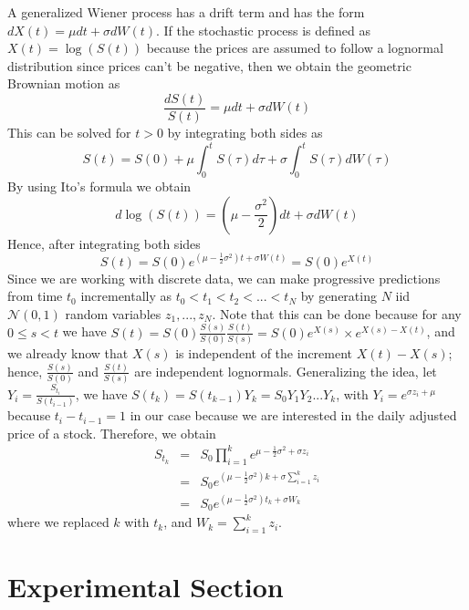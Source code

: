 \documentclass[12pt, A4]{article}
\begin{document}
A generalized Wiener process has a drift term and has the form $dX(t) = \mu dt + \sigma dW(t)$.
If the stochastic process is defined as $X(t)= \log(S(t))$ because the prices are assumed to follow a lognormal distribution since prices can't be negative, then we obtain the geometric Brownian motion as
\begin{equation}
	\frac{dS(t)}{S(t)} = \mu dt + \sigma dW(t) \label{GBM_diff}
\end{equation}
This can be solved for $t>0$ by integrating both sides as
\begin{equation}
	S(t) = S(0) + \mu \int_{0}^{t}S(\tau) d\tau + \sigma \int_{0}^{t} S(\tau)dW(\tau) \label{integrate_SDE}
\end{equation}
By using Ito's formula we obtain
\begin{equation}
	d\log(S(t)) = (\mu - \frac{\sigma^{2}}{2})dt + \sigma dW(t)
\end{equation}
Hence, after integrating both sides
\begin{equation}
	S(t) = S(0) e^{(\mu-\frac{1}{2}\sigma^{2})t +\sigma W(t)} = S(0)e^{X(t)}
\end{equation}
Since we are working with discrete data, we can make progressive predictions from time $t_{0}$ incrementally as $t_{0}<t_{1}<t_{2}<...<t_{N}$ by generating $N$ iid $\mathcal{N}(0,1)$ random variables $z_{1},...,z_{N}$. Note that this can be done because for any $0\leq s <t$ we have $S(t)= S(0) \frac{S(s)}{S(0)}\frac{S(t)}{S(s)}= S(0)e^{X(s)}\times e^{X(s)-X(t)}$, and we already know that $X(s)$ is independent of the increment $X(t)-X(s)$; hence, $\frac{S(s)}{S(0)}$ and $\frac{S(t)}{S(s)}$ are independent lognormals. Generalizing the idea, let $Y_{i}= \frac{S_{t_{i}}}{S(t_{i-1})}$, we have $S(t_{k})= S(t_{k-1})Y_{k} = S_{0} Y_{1}Y_{2}...Y_{k}$, with $Y_{i} = e^{\sigma z_{i} + \mu}$ because $t_{i}-t_{i-1}=1$ in our case because we are interested in the daily adjusted price of a stock. Therefore, we obtain
\begin{eqnarray}
	S_{t_k} &=& S_{0} \prod_{i=1}^{k} e^{\mu - \frac{1}{2}\sigma^{2} + \sigma z_{i} } \nonumber \\
	&=& S_{0} e^{ (\mu - \frac{1}{2}\sigma^{2})k + \sigma \sum_{i=1}^{k} z_{i} } \nonumber \\
	&=& S_{0} e^{ (\mu - \frac{1}{2}\sigma^{2})t_{k} + \sigma W_{k} }
\end{eqnarray}
where we replaced $k$ with $t_{k}$, and $W_{k} = \sum_{i=1}^{k}z_{i}$.

\section{Experimental Section}
\end{document}
